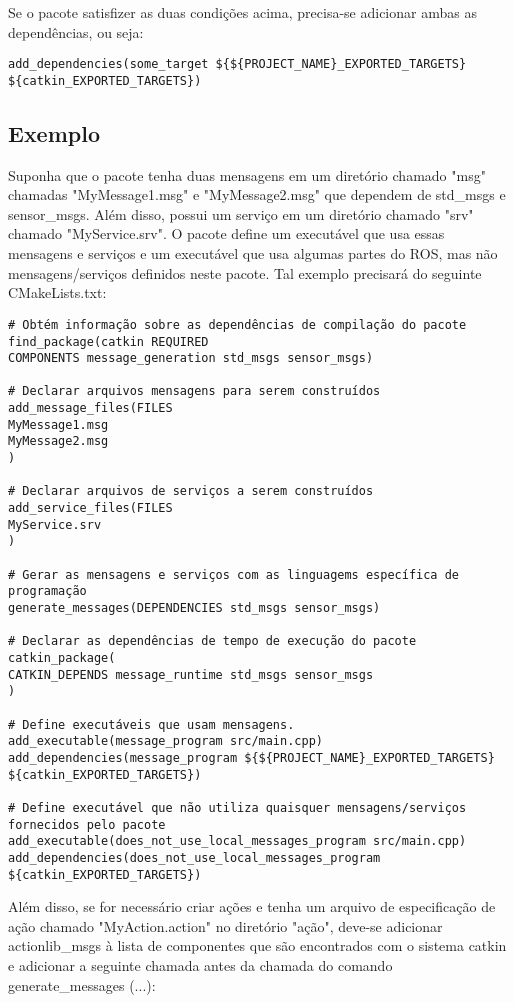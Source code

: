 Se o pacote satisfizer as duas condições acima, precisa-se adicionar ambas as dependências, ou seja:

\begin{verbatim}
add_dependencies(some_target ${${PROJECT_NAME}_EXPORTED_TARGETS} ${catkin_EXPORTED_TARGETS})
\end{verbatim}

\subsection{Exemplo}

Suponha que o pacote tenha duas mensagens em um diretório chamado "msg" chamadas "MyMessage1.msg" e "MyMessage2.msg" que dependem de std\_msgs e sensor\_msgs. Além disso, possui um serviço em um diretório chamado "srv" chamado "MyService.srv". O pacote define um executável que usa essas mensagens e serviços e um executável que usa algumas partes do ROS, mas não mensagens/serviços definidos neste pacote. Tal exemplo precisará do seguinte CMakeLists.txt:

\begin{verbatim}
# Obtém informação sobre as dependências de compilação do pacote
find_package(catkin REQUIRED
COMPONENTS message_generation std_msgs sensor_msgs)

# Declarar arquivos mensagens para serem construídos
add_message_files(FILES
MyMessage1.msg
MyMessage2.msg
)

# Declarar arquivos de serviços a serem construídos
add_service_files(FILES
MyService.srv
)

# Gerar as mensagens e serviços com as linguagems específica de programação
generate_messages(DEPENDENCIES std_msgs sensor_msgs)

# Declarar as dependências de tempo de execução do pacote
catkin_package(
CATKIN_DEPENDS message_runtime std_msgs sensor_msgs
)

# Define executáveis que usam mensagens.
add_executable(message_program src/main.cpp)
add_dependencies(message_program ${${PROJECT_NAME}_EXPORTED_TARGETS} ${catkin_EXPORTED_TARGETS})

# Define executável que não utiliza quaisquer mensagens/serviços fornecidos pelo pacote
add_executable(does_not_use_local_messages_program src/main.cpp)
add_dependencies(does_not_use_local_messages_program ${catkin_EXPORTED_TARGETS})
\end{verbatim}

Além disso, se for necessário criar ações e tenha um arquivo de especificação de ação chamado "MyAction.action" no diretório "ação", deve-se adicionar actionlib\_msgs à lista de componentes que são encontrados com o sistema catkin e adicionar a seguinte chamada antes da chamada do comando generate\_messages (...):

